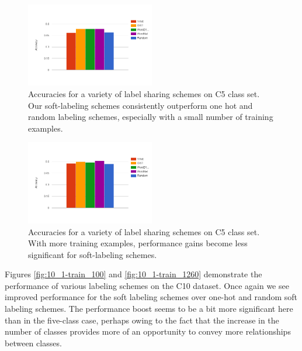 \begin{figure}[!tb]
  \centering
  \includegraphics[width=0.5\textwidth]{figs/5_1-train_100.png}
  \caption{
      Accuracies for a variety of label sharing schemes on C5 class set. Our
      soft-labeling schemes consistently outperform one hot and random labeling
      schemes, especially with a small number of training examples.
  }
  \label{fig:5_1-train_100}
\end{figure}

\begin{figure}[!tb]
  \centering
  \includegraphics[width=0.5\textwidth]{figs/5_1-train_1260.png}
  \caption{
      Accuracies for a variety of label sharing schemes on C5 class set. With
      more training examples, performance gains become less significant for
      soft-labeling schemes.
  }
  \label{fig:5_1-train_1260}
\end{figure}

Figures \ref{fig:10_1-train_100} and \ref{fig:10_1-train_1260} demonstrate the
performance of various labeling schemes on the C10 dataset. Once again we see
improved performance for the soft labeling schemes over one-hot and random soft
labeling schemes. The performance boost seems to be a bit more significant here
than in the five-class case, perhaps owing to the fact that the increase in the
number of classes provides more of an opportunity to convey more relationships
between classes.

